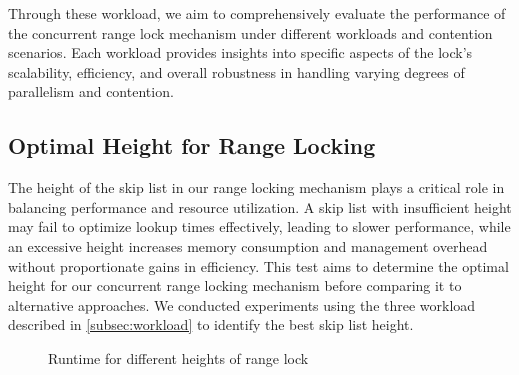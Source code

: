 Through these workload, we aim to comprehensively evaluate the performance of the concurrent range lock mechanism under different workloads and contention scenarios. Each workload provides insights into specific aspects of the lock's scalability, efficiency, and overall robustness in handling varying degrees of parallelism and contention.

\subsection{Optimal Height for Range Locking}

The height of the skip list in our range locking mechanism plays a critical role in balancing performance and resource utilization. A skip list with insufficient height may fail to optimize lookup times effectively, leading to slower performance, while an excessive height increases memory consumption and management overhead without proportionate gains in efficiency. This test aims to determine the optimal height for our concurrent range locking mechanism before comparing it to alternative approaches. We conducted experiments using the three workload described in \ref{subsec:workload} to identify the best skip list height.

\begin{figure}[h]
    \centering
    \caption{Runtime for different heights of range lock}
\end{figure}


